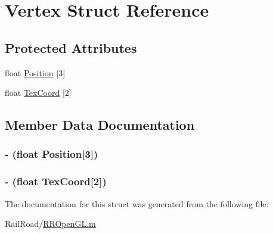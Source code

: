 \hypertarget{struct_vertex}{\section{Vertex Struct Reference}
\label{struct_vertex}
}
\subsection*{Protected Attributes}
\begin{DoxyCompactItemize}
\item 
float \hyperlink{struct_vertex_ae071876ae6302fc4b4ec16c673553e39}{Position} \mbox{[}3\mbox{]}
\item 
float \hyperlink{struct_vertex_ae5a67c2a74f3fa1c508f3fd8baf80974}{Tex\-Coord} \mbox{[}2\mbox{]}
\end{DoxyCompactItemize}


\subsection{Member Data Documentation}
\hypertarget{struct_vertex_ae071876ae6302fc4b4ec16c673553e39}{
\subsubsection[{Position}]{\setlength{\rightskip}{0pt plus 5cm}-\/ (float Position\mbox{[}3\mbox{]})\hspace{0.3cm}{\ttfamily [protected]}}}\label{struct_vertex_ae071876ae6302fc4b4ec16c673553e39}
\hypertarget{struct_vertex_ae5a67c2a74f3fa1c508f3fd8baf80974}{
\subsubsection[{Tex\-Coord}]{\setlength{\rightskip}{0pt plus 5cm}-\/ (float Tex\-Coord\mbox{[}2\mbox{]})\hspace{0.3cm}{\ttfamily [protected]}}}\label{struct_vertex_ae5a67c2a74f3fa1c508f3fd8baf80974}


The documentation for this struct was generated from the following file\-:\begin{DoxyCompactItemize}
\item 
Rail\-Road/\hyperlink{_r_r_open_g_l_8m}{R\-R\-Open\-G\-L.\-m}\end{DoxyCompactItemize}
